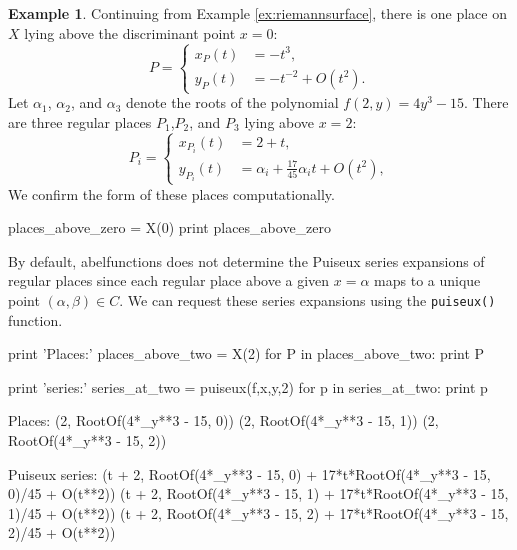 \documentclass[12pt]{article}
\theoremstyle{definition}
\newtheorem{example}[theorem]{Example}
\begin{document}
\begin{example} \label{ex:places} %
Continuing from Example \ref{ex:riemannsurface}, there is one place on
$X$ lying above the discriminant point $x=0$:
\begin{equation}
  P =
  \begin{cases}
    x_{P}(t) &= -t^3, \\
    y_{P}(t) &= -t^{-2} + O\left( t^2 \right).
  \end{cases}
\end{equation}
Let $\alpha_1$, $\alpha_2$, and $\alpha_3$ denote the roots of the
polynomial $f(2,y) = 4y^3 - 15$. There are three regular places
$P_1$,$P_2$, and $P_3$ lying above $x=2$:
\begin{equation}
  P_i =
  \begin{cases}
    x_{P_i}(t) &= 2 + t, \\
    y_{P_i}(t) &= \alpha_i + \tfrac{17}{45}\alpha_i t + O\left(t^2\right),
  \end{cases}
\end{equation}
We confirm the form of these places computationally.
\begin{ipythoninput}
places_above_zero = X(0)
print places_above_zero
\end{ipythoninput}
\begin{ipythonoutput}
[(-t**3, -1/t**2 + O(t**2))]
\end{ipythonoutput}
By default, {\sc abelfunctions} does not determine the Puiseux series
expansions of regular places since each regular place above a given
$x=\alpha$ maps to a unique point $(\alpha,\beta) \in C$. We can request
these series expansions using the {\tt puiseux()} function.
\begin{ipythoninput}
print 'Places:'
places_above_two = X(2)
for P in places_above_two:
    print P

print '\nPuiseux series:'
series_at_two = puiseux(f,x,y,2)
for p in series_at_two:
    print p
\end{ipythoninput}
\begin{ipythonoutput}
Places:
(2, RootOf(4*_y**3 - 15, 0))
(2, RootOf(4*_y**3 - 15, 1))
(2, RootOf(4*_y**3 - 15, 2))

Puiseux series:
(t + 2, RootOf(4*_y**3 - 15, 0) + 17*t*RootOf(4*_y**3 - 15, 0)/45 + O(t**2))
(t + 2, RootOf(4*_y**3 - 15, 1) + 17*t*RootOf(4*_y**3 - 15, 1)/45 + O(t**2))
(t + 2, RootOf(4*_y**3 - 15, 2) + 17*t*RootOf(4*_y**3 - 15, 2)/45 + O(t**2))
\end{ipythonoutput}

\end{example}
\end{document}
